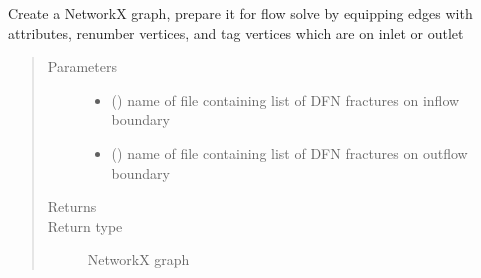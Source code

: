 \documentclass[letterpaper,10pt,english]{sphinxmanual}
\begin{document}

\begin{fulllineitems}
\label{\detokenize{pydfnworks:pydfnworks.dfnGraph.graph_flow.prepare_graph_with_attributes}}
Create a NetworkX graph, prepare it for flow solve by equipping edges with  attributes, renumber vertices, and tag vertices which are on inlet or outlet
\begin{quote}\begin{description}
\item[{Parameters}] \leavevmode\begin{itemize}
\item {} 
 () \textendash{} name of file containing list of DFN fractures on inflow boundary

\item {} 
 () \textendash{} name of file containing list of DFN fractures on outflow boundary

\end{itemize}

\item[{Returns}] \leavevmode
{}

\item[{Return type}] \leavevmode
NetworkX graph

\end{description}\end{quote}

\end{fulllineitems}

\end{document}
